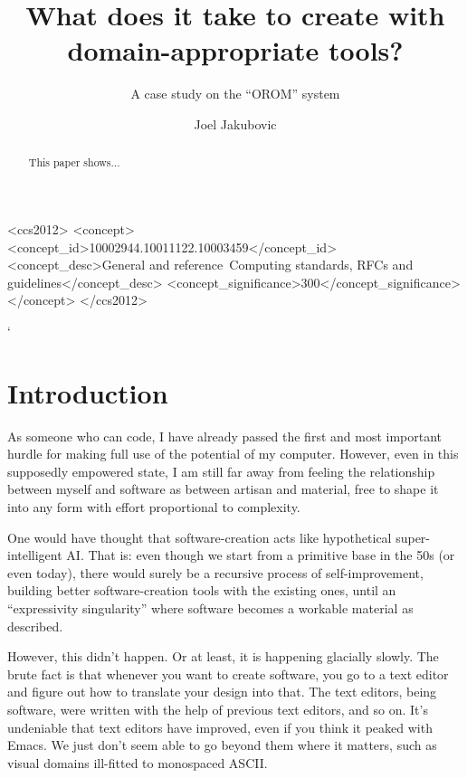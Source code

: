 \documentclass[english,submission]{programming}
\begin{document}

\title{What does it take to create with domain-appropriate tools?}
\subtitle{A case study on the ``OROM'' system}
\author{Joel Jakubovic}


\begin{CCSXML}
<ccs2012>
<concept>
<concept_id>10002944.10011122.10003459</concept_id>
<concept_desc>General and reference~Computing standards, RFCs and guidelines</concept_desc>
<concept_significance>300</concept_significance>
</concept>
</ccs2012>
\end{CCSXML}

`

\maketitle

\begin{abstract}
  This paper shows...
\end{abstract}

  \hypertarget{introduction}{%
  \section{Introduction}\label{introduction}}

  As someone who can code, I have already passed the first and most
  important hurdle for making full use of the potential of my computer.
  However, even in this supposedly empowered state, I am still far away
  from feeling the relationship between myself and software as between
  artisan and material, free to shape it into any form with effort
  proportional to complexity.

  One would have thought that software-creation acts like hypothetical
  super-intelligent AI. That is: even though we start from a primitive
  base in the 50s (or even today), there would surely be a recursive
  process of self-improvement, building better software-creation tools
  with the existing ones, until an ``expressivity singularity'' where
  software becomes a workable material as described.

  However, this didn't happen. Or at least, it is happening glacially
  slowly. The brute fact is that whenever you want to create software, you
  go to a text editor and figure out how to translate your design into
  that. The text editors, being software, were written with the help of
  previous text editors, and so on. It's undeniable that text editors have
  improved, even if you think it peaked with Emacs. We just don't seem
  able to go beyond them where it matters, such as visual domains
  ill-fitted to monospaced ASCII.
\end{document}
